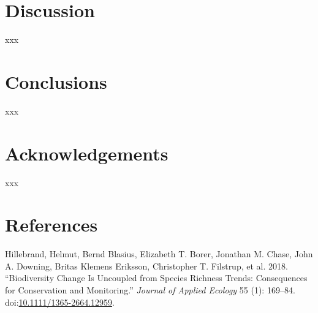 \documentclass[fleqn,10pt,lineno]{wlpeerj} %
\begin{document}
\section*{Discussion}\label{discussion}

xxx

\section*{Conclusions}\label{conclusions}

xxx

\section*{Acknowledgements}\label{acknowledgements}

xxx

\section*{References}\label{references}

\hypertarget{refs}{}
\hypertarget{ref-Hillebrand2018}{}
Hillebrand, Helmut, Bernd Blasius, Elizabeth T. Borer, Jonathan M.
Chase, John A. Downing, Britas Klemens Eriksson, Christopher T.
Filstrup, et al. 2018. ``Biodiversity Change Is Uncoupled from Species
Richness Trends: Consequences for Conservation and Monitoring.''
\emph{Journal of Applied Ecology} 55 (1): 169--84.
doi:\href{https://doi.org/10.1111/1365-2664.12959}{10.1111/1365-2664.12959}.
\end{document}
